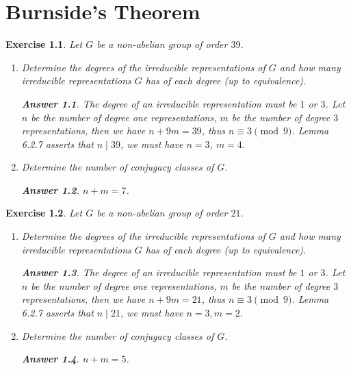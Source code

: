 \documentclass[11pt]{report}
\theoremstyle{mythm}
\newtheorem{exercise}{Exercise}[chapter]
\theoremstyle{myans}
\newtheorem*{answer}{Answer}
\begin{document}
\setcounter{chapter}{5}
\chapter{Burnside's Theorem}

\setcounter{exercise}{1}
\begin{exercise}
  Let $G$ be a non-abelian group of order $39$.
  \begin{enumerate}
    \item Determine the degrees of the irreducible representations of $G$ and how many
    irreducible representations $G$ has of each degree (up to equivalence).
    \begin{answer}
      The degree of an irreducible representation must be $1$ or $3$.
      Let $n$ be the number of degree one representations, $m$ be the number
      of degree $3$ representations, then we have
      $n + 9m = 39$, thus $n \equiv 3 \pmod 9$. Lemma 6.2.7 asserts that
      $n \mid 39$, we must have $n=3$, $m=4$.
    \end{answer}
    \item Determine the number of conjugacy classes of $G$.
    \begin{answer}
      $n + m = 7$.
    \end{answer}
  \end{enumerate}
\end{exercise}

\begin{exercise}
  Let $G$ be a non-abelian group of order $21$.
  \begin{enumerate}
    \item Determine the degrees of the irreducible representations of $G$ and how many
    irreducible representations $G$ has of each degree (up to equivalence).
    \begin{answer}
      The degree of an irreducible representation must be $1$ or $3$.
      Let $n$ be the number of degree one representations, $m$ be the number
      of degree $3$ representations, then we have
      $n + 9m = 21$, thus $n \equiv 3 \pmod 9$. Lemma 6.2.7 asserts that
      $n \mid 21$, we must have $n=3, m = 2$.
    \end{answer}
    \item Determine the number of conjugacy classes of $G$.
    \begin{answer}
      $n + m = 5$.
    \end{answer}
  \end{enumerate}
\end{exercise}
\end{document}
